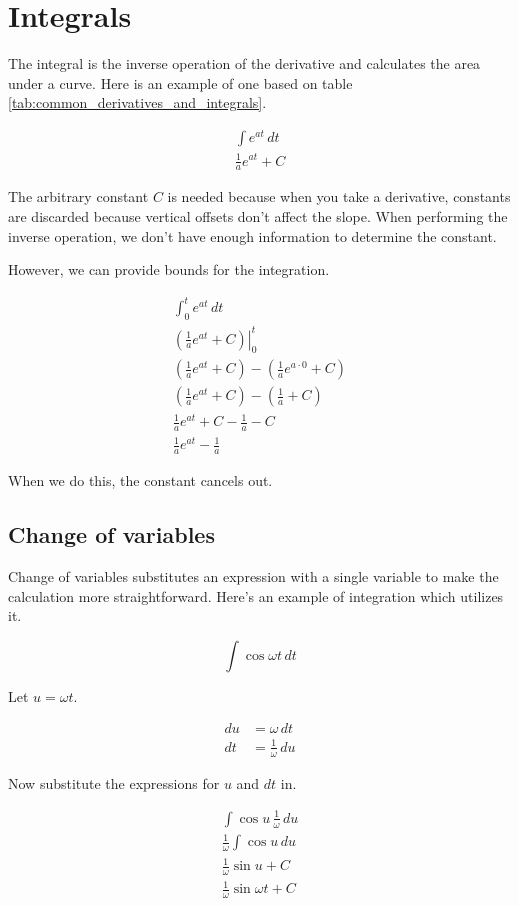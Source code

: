 \section{Integrals}

The integral is the inverse operation of the derivative and calculates the area
under a curve. Here is an example of one based on table
\ref{tab:common_derivatives_and_integrals}.

\begin{align*}
  \int e^{at} \,dt \\
  \frac{1}{a}e^{at} + C
\end{align*}

The arbitrary constant $C$ is needed because when you take a derivative,
constants are discarded because vertical offsets don't affect the slope. When
performing the inverse operation, we don't have enough information to determine
the constant.

However, we can provide bounds for the integration.

\begin{align*}
  \int_0^t e^{at} \,dt \\
  \left.\left(\frac{1}{a}e^{at} + C\right)\right\vert_0^t \\
  \left(\frac{1}{a}e^{at} + C\right) -
    \left(\frac{1}{a}e^{a \cdot 0} + C\right) \\
  \left(\frac{1}{a}e^{at} + C\right) - \left(\frac{1}{a} + C\right) \\
  \frac{1}{a}e^{at} + C - \frac{1}{a} - C \\
  \frac{1}{a}e^{at} - \frac{1}{a}
\end{align*}

When we do this, the constant cancels out.

\subsection{Change of variables}
\label{subsec:calculus_change_of_vars}

Change of variables substitutes an expression with a single variable to make the
calculation more straightforward. Here's an example of integration which
utilizes it.

\begin{equation*}
  \int \cos\omega t \,dt
\end{equation*}

Let $u = \omega t$.

\begin{align*}
  du &= \omega \,dt \\
  dt &= \frac{1}{\omega} \,du
\end{align*}

Now substitute the expressions for $u$ and $dt$ in.

\begin{align*}
  \int \cos u \,\frac{1}{\omega} \,du \\
  \frac{1}{\omega} \int \cos u \,du \\
  \frac{1}{\omega} \sin u + C \\
  \frac{1}{\omega} \sin\omega t + C
\end{align*}

